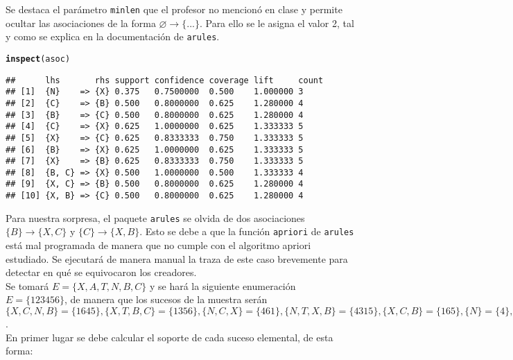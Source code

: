\documentclass[12pt]{report}\usepackage[]{graphicx}\usepackage[dvipsnames]{xcolor}
\makeatletter
\newcommand{\hlstd}[1]{\textcolor[rgb]{0.345,0.345,0.345}{#1}}%
\newcommand{\hlkwd}[1]{\textcolor[rgb]{0.737,0.353,0.396}{\textbf{#1}}}%
\newenvironment{kframe}{%
 \def\at@end@of@kframe{}%
 \ifinner\ifhmode%
  \def\at@end@of@kframe{\end{minipage}}%
  \begin{minipage}{\columnwidth}%
 \fi\fi%
 \def\FrameCommand##1{\hskip\@totalleftmargin \hskip-\fboxsep
 \colorbox{shadecolor}{##1}\hskip-\fboxsep
     \hskip-\linewidth \hskip-\@totalleftmargin \hskip\columnwidth}%
 \MakeFramed {\advance\hsize-\width
   \@totalleftmargin\z@ \linewidth\hsize
   \@setminipage}}%
 {\par\unskip\endMakeFramed%
 \at@end@of@kframe}
\newenvironment{knitrout}{}{} %
\makeatother
\begin{document}
			Se destaca el parámetro \texttt{minlen} que el profesor no mencionó en clase y permite ocultar las asociaciones de la forma $\varnothing \rightarrow \{...\}$. Para ello se le asigna el valor 2, tal y como se explica en la documentación de \texttt{arules}. 
			
\begin{knitrout}
\color{fgcolor}\begin{kframe}
\begin{alltt}
\hlkwd{inspect}\hlstd{(asoc)}
\end{alltt}
\begin{verbatim}
##      lhs       rhs support confidence coverage lift     count
## [1]  {N}    => {X} 0.375   0.7500000  0.500    1.000000 3    
## [2]  {C}    => {B} 0.500   0.8000000  0.625    1.280000 4    
## [3]  {B}    => {C} 0.500   0.8000000  0.625    1.280000 4    
## [4]  {C}    => {X} 0.625   1.0000000  0.625    1.333333 5    
## [5]  {X}    => {C} 0.625   0.8333333  0.750    1.333333 5    
## [6]  {B}    => {X} 0.625   1.0000000  0.625    1.333333 5    
## [7]  {X}    => {B} 0.625   0.8333333  0.750    1.333333 5    
## [8]  {B, C} => {X} 0.500   1.0000000  0.500    1.333333 4    
## [9]  {X, C} => {B} 0.500   0.8000000  0.625    1.280000 4    
## [10] {X, B} => {C} 0.500   0.8000000  0.625    1.280000 4
\end{verbatim}
\end{kframe}
\end{knitrout}
			
			Para nuestra sorpresa, el paquete \texttt{arules} se olvida de dos asociaciones $\{B\} \rightarrow \{X, C\}$ y $\{C\} \rightarrow \{X, B\}$. Esto se debe a que la función \texttt{apriori} de \texttt{arules} está mal programada de manera que no cumple con el algoritmo apriori estudiado. Se ejecutará de manera manual la traza de este caso brevemente para detectar en qué se equivocaron los creadores. \\
			
			Se tomará $E = \{X, A, T, N, B, C\}$ y se hará la siguiente enumeración $E = \{123456\}$, de manera que los sucesos de la muestra serán $\{X, C, N, B\} = \{1645\}, \{X, T, B, C\} = \{1356\}, \{N, C, X\} = \{461\}, \{N, T, X, B\} = \{4315\}, \{X, C, B\} = \{165\}, \{N\} = \{4\}, \{X, B, C\} = \{156\}, \{T, A\} = \{32\}$. \\
			
			En primer lugar se debe calcular el soporte de cada suceso elemental, de esta forma: 
			
\end{document}
